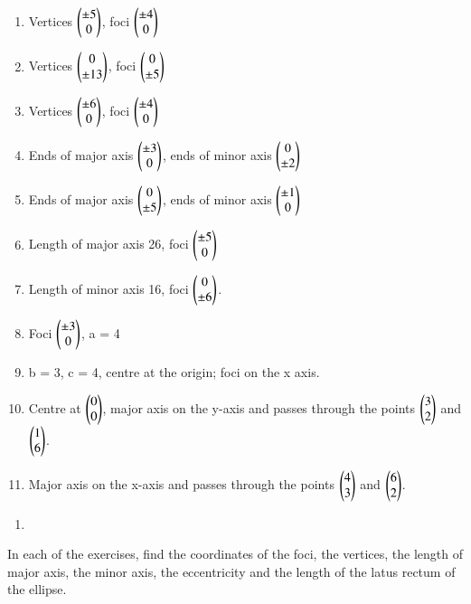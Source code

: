 \begin{enumerate}
\item Vertices $\begin{pmatrix}\pm 5\\ 0\end{pmatrix}$, foci $\begin{pmatrix}\pm 4\\ 0\end{pmatrix}$ \item  Vertices $\begin{pmatrix}0\\ \pm 13\end{pmatrix}$, foci $\begin{pmatrix}0\\ \pm 5\end{pmatrix}$ \item  Vertices $\begin{pmatrix}\pm 6\\ 0\end{pmatrix}$, foci $\begin{pmatrix}\pm 4\\ 0\end{pmatrix}$ \item  Ends of major axis $\begin{pmatrix}\pm 3\\ 0\end{pmatrix}$, ends of minor axis $\begin{pmatrix}0\\ \pm 2\end{pmatrix}$
\item  Ends of major axis $\begin{pmatrix}0\\ \pm 5 \end{pmatrix}$, ends of minor axis $\begin{pmatrix}\pm 1\\ 0\end{pmatrix}$ \item  Length of major axis 26, foci $\begin{pmatrix}\pm 5\\ 0\end{pmatrix}$ \item  Length of minor axis 16, foci $\begin{pmatrix}0\\ \pm 6\end{pmatrix}$. \item  Foci $\begin{pmatrix}\pm 3\\ 0\end{pmatrix}$, a = 4 \item  b = 3, c = 4, centre at the origin; foci on the x axis. \item  Centre at $\begin{pmatrix}0\\0\end{pmatrix}$, major axis on the y-axis and passes through the points $\begin{pmatrix}3\\ 2\end{pmatrix}$ and $\begin{pmatrix}1\\6\end{pmatrix}$.
\item  Major axis on the x-axis and passes through the points $\begin{pmatrix}4\\3\end{pmatrix}$ and $\begin{pmatrix}6\\2\end{pmatrix}$.
\end{enumerate}
%
\solution
\begin{enumerate}
    \item 
    
\end{enumerate}
%
\item In each of the exercises, find the coordinates of the foci, the vertices, the length of major axis, the minor axis, the eccentricity and the length of the latus rectum of the ellipse.
%
